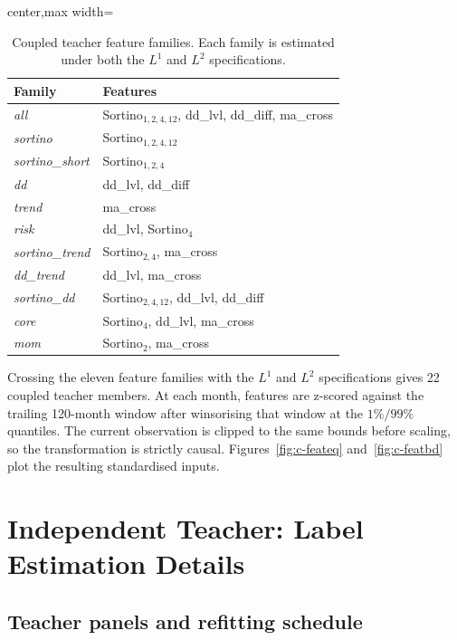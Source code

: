 \begin{table}[H]
\centering
\caption{Coupled teacher feature families. Each family is estimated under both the \(L^1\)
and \(L^2\) specifications.}
\label{tab:c-feature-families}
\small
\begin{adjustbox}{center,max width=\linewidth}
\begin{tabular}{ll}
\toprule
Family & Features \\
\midrule
\emph{all} & Sortino$_{1,2,4,12}$, dd\_lvl, dd\_diff, ma\_cross \\
\emph{sortino} & Sortino$_{1,2,4,12}$ \\
\emph{sortino\_short} & Sortino$_{1,2,4}$ \\
\emph{dd} & dd\_lvl, dd\_diff \\
\emph{trend} & ma\_cross \\
\emph{risk} & dd\_lvl, Sortino$_4$ \\
\emph{sortino\_trend} & Sortino$_{2,4}$, ma\_cross \\
\emph{dd\_trend} & dd\_lvl, ma\_cross \\
\emph{sortino\_dd} & Sortino$_{2,4,12}$, dd\_lvl, dd\_diff \\
\emph{core} & Sortino$_4$, dd\_lvl, ma\_cross \\
\emph{mom} & Sortino$_2$, ma\_cross \\
\bottomrule
\end{tabular}
\end{adjustbox}
\end{table}

Crossing the eleven feature families with the \(L^1\) and \(L^2\) specifications gives
22 coupled teacher members. At each month, features are z-scored against the trailing
120-month window after winsorising that window at the \(1\%/99\%\) quantiles. The current
observation is clipped to the same bounds before scaling, so the transformation is strictly
causal. Figures~\ref{fig:c-feateq} and~\ref{fig:c-featbd} plot the resulting standardised
inputs.

\section{Independent Teacher: Label Estimation Details}
\label{app:teacher-labels}
\label{app:teacher-independent}

\subsection{Teacher panels and refitting schedule}


